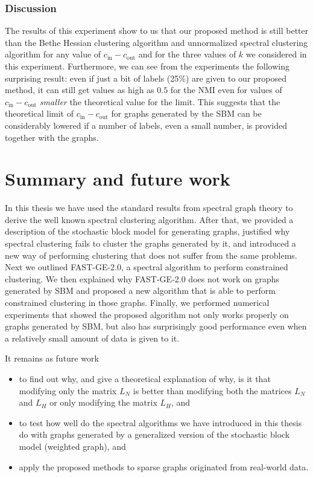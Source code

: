 \subsection*{Discussion}
The results of this experiment show to us that our proposed method is still better than the Bethe Hessian clustering algorithm and unnormalized spectral clustering algorithm for any value of $c_\text{in} - c_\text{out}$ and for the three values of $k$ we considered in this experiment.
Furthermore, we can see from the experiments the following surprising result: even if just a bit of labels (25\%) are given to our proposed method, it can still get values as high as $0.5$ for the NMI even for values of $c_\text{in} - c_\text{out}$ \textit{smaller} the theoretical value for the limit.
This suggests that the theoretical limit of $c_\text{in} - c_\text{out}$ for graphs generated by the SBM can be considerably lowered if a number of labels, even a small number, is provided together with the graphs.




\chapter{Summary and future work}
In this thesis we have used the standard results from spectral graph theory to derive the well known spectral clustering algorithm. 
After that, we provided a description of the stochastic block model for generating graphs, justified why spectral clustering fails to cluster the graphs generated by it, and introduced a new way of performing clustering that does not suffer from the same problems.
Next we outlined FAST-GE-2.0, a spectral algorithm to perform constrained clustering.
We then explained why FAST-GE-2.0 does not work on graphs generated by SBM and proposed a new algorithm that is able to perform constrained clustering in those graphs.
Finally, we performed numerical experiments that showed the proposed algorithm not only works properly on graphs generated by SBM, but also has surprisingly good performance even when a relatively small amount of data is given to it.

It remains as future work 
\begin{itemize}
   \item to find out why, and give a theoretical explanation of why, is it that modifying only the matrix $L_N$ is better than modifying both the matrices $L_N$ and $L_H$ or only modifying the matrix $L_H$, and
   \item to test how well do the spectral algorithms we have introduced in this thesis do with graphs generated by a generalized version of the stochastic block model (weighted graph), and
   \item apply the proposed methods to sparse graphs originated from real-world data.
\end{itemize}


